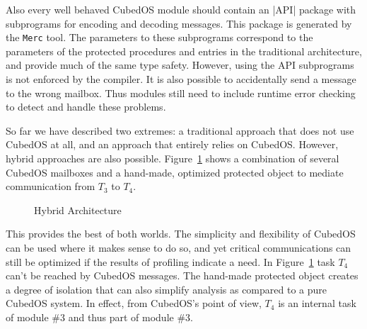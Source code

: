 Also every well behaved CubedOS module should contain an |API| package with subprograms for
encoding and decoding messages. This package is generated by the \texttt{Merc} tool. The
parameters to these subprograms correspond to the parameters of the protected procedures and
entries in the traditional architecture, and provide much of the same type safety. However,
using the API subprograms is not enforced by the compiler. It is also possible to accidentally
send a message to the wrong mailbox. Thus modules still need to include runtime error checking
to detect and handle these problems.

So far we have described two extremes: a traditional approach that does not use CubedOS at all,
and an approach that entirely relies on CubedOS. However, hybrid approaches are also possible.
Figure~\ref{fig:hybrid-architecture} shows a combination of several CubedOS mailboxes and a
hand-made, optimized protected object to mediate communication from $T_3$ to $T_4$.

\begin{figure}[tbhp]
  \center
  \caption{Hybrid Architecture}
  \label{fig:hybrid-architecture}
\end{figure}

This provides the best of both worlds. The simplicity and flexibility of CubedOS can be used
where it makes sense to do so, and yet critical communications can still be optimized if the
results of profiling indicate a need. In Figure~\ref{fig:hybrid-architecture} task $T_4$ can't
be reached by CubedOS messages. The hand-made protected object creates a degree of isolation
that can also simplify analysis as compared to a pure CubedOS system. In effect, from CubedOS's
point of view, $T_4$ is an internal task of module \#3 and thus part of module \#3.

